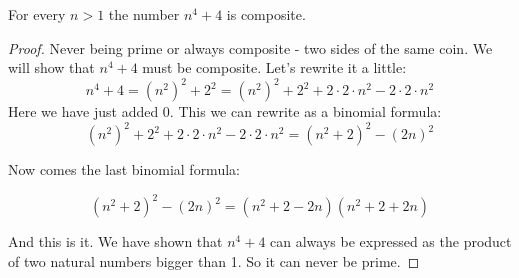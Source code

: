 \documentclass{article}
\theoremstyle{definition}
\begin{document}
\begin{theorem}
    For every $n>1$ the number $n^4+4$ is composite.
\end{theorem}

\begin{proof}
    Never being prime or always composite - two sides of the same coin. We will show that $n^4+4$ must be composite. Let's rewrite it a little:
    \begin{equation}
        n^4+4 = (n^2)^2 + 2^2 = (n^2)^2 + 2^2 + 2\cdot 2 \cdot n^2 - 2 \cdot 2 \cdot n^2
    \end{equation}
    Here we have just added 0. This we can rewrite as a binomial formula:
    \begin{equation}
        (n^2)^2 + 2^2 + 2\cdot 2 \cdot n^2 - 2 \cdot 2 \cdot n^2 = (n^2 +2)^2 -(2n)^2
    \end{equation}

Now comes the last binomial formula:

\begin{equation}
    (n^2 +2)^2 -(2n)^2 = (n^2 + 2 -2n)(n^2 + 2 + 2n)
\end{equation}

And this is it. We have shown that $n^4+4$ can always be expressed as the product of two natural numbers bigger than 1. So it can never be prime.




    
\end{proof}
\end{document}
